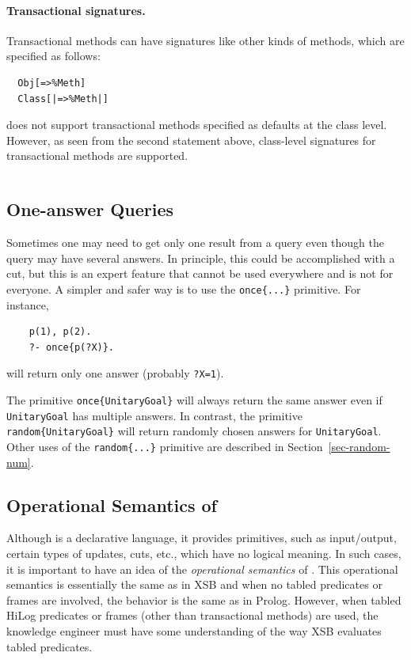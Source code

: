 \documentclass[11pt]{article}
\newcommand{\ERGO}{\mbox{\smaller{\ensuremath{\cal{E}}\smaller{{\sc{RGO}}}}}\xspace}
\newcommand{\FLSYSTEM}{\ERGO}
\begin{document}
\paragraph{Transactional signatures.}
Transactional methods can have signatures like other kinds of methods, which
are specified as follows:
\begin{verbatim}
  Obj[=>%Meth]
  Class[|=>%Meth|]
\end{verbatim}
\FLSYSTEM does not support transactional methods specified as defaults at the
class level. However, as seen from the second statement above, class-level
signatures for transactional methods are supported.
\begin{verbatim}
\end{verbatim}

\subsection{One-answer Queries}

Sometimes one may need to get only one result from a query even though the
query may have several answers. In principle, this could be accomplished
with a cut, but this is an expert feature that cannot be used everywhere
and is not for everyone.
A simpler and safer way is to use the \texttt{once\{...\}} primitive.
For instance,
\begin{verbatim}
    p(1), p(2).
    ?- once{p(?X)}.
\end{verbatim}
will return only one answer (probably \texttt{?X=1}).

The primitive \texttt{once\{UnitaryGoal\}}
will always return the same answer
even if  \texttt{UnitaryGoal} has multiple answers.
In contrast, the primitive \texttt{random\{UnitaryGoal\}}
will return randomly chosen answers for \texttt{UnitaryGoal}. 
Other uses of the \texttt{random\{...\}} primitive are described in
Section~\ref{sec-random-num}. 



\subsection{Operational Semantics of \FLSYSTEM}\label{sec-flora-operational}

Although \FLSYSTEM is a declarative language, it provides primitives, such as
input/output, certain types of updates, cuts, etc., which have no logical
meaning. In such cases, it is important to have an idea of the
\emph{operational semantics} of \FLSYSTEM. This operational semantics is
essentially the same as in XSB and when no tabled predicates or frames
are involved, the behavior is the same as in Prolog. However, when tabled
HiLog predicates or frames (other than transactional methods) are used,
the knowledge engineer must have some understanding of the way XSB evaluates tabled
predicates.
\end{document}
